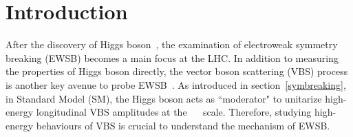 \section{Introduction}

After the discovery of Higgs boson~\cite{20121, 201230}, the examination of electroweak symmetry breaking (EWSB) becomes a main focus at the LHC.
In addition to measuring the properties of Higgs boson directly, the vector boson scattering (VBS) process is another key avenue to probe EWSB~\cite{Lee:1977yc, Chanowitz:1985hj, Szleper:2014xxa}.
As introduced in section~\ref{symbreaking}, in Standard Model (SM), the Higgs boson acts as ``moderator" to unitarize high-energy longitudinal VBS amplitudes at the ~\tev~ scale.
Therefore, studying high-energy behaviours of VBS is crucial to understand the mechanism of EWSB.

